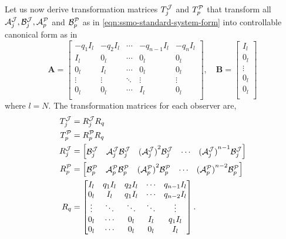 Let us now derive transformation matrices $T^{\mathcal{J}}_{j}$ and $T_p^{\mathcal{P}}$ that transform all $\mathcal{A}^{\mathcal{J}}_{j},\mathcal{B}^{\mathcal{J}}_{j},\mathcal{A}^{\mathcal{P}}_{p}$ and $\mathcal{B}^{\mathcal{P}}_{p}$ as in \eqref{eqn:ssmo-standard-system-form} into controllable canonical form as in \cite[Sec. 4.3.2]{Hespanha2018LinearTheory}
\begin{equation}\label{eqn:controllable-canonical-form}
    \mathbf{A} =
    \begin{bmatrix}
        -q_1I_l & -q_2I_l & \cdots & -q_{n-1}I_l & -q_nI_l \\
        I_l & 0_l & \cdots & 0_l & 0_l \\
        0_l & I_l & \cdots & 0_l & 0_l \\
        \vdots & \vdots & \ddots & \vdots & \vdots \\
        0_l & 0_l & \cdots & I_l & 0_l \\
    \end{bmatrix}, \quad
    \mathbf{B} = 
    \begin{bmatrix}
        I_l \\ 0_l \\ \vdots \\ 0_l \\ 0_l \\
    \end{bmatrix}
\end{equation}
where $l=N$. The transformation matrices for each observer are,
\begin{equation}\label{eqn:ssmo-transformation}
    \begin{split}
        T_{j}^{\mathcal{J}} &= R_j^{\mathcal{J}}R_q \\
        T_{p}^{\mathcal{P}} &= R_p^{\mathcal{P}}R_q \\
        R_j^{\mathcal{J}} &= 
        \begin{bmatrix}
            \mathcal{B}^{\mathcal{J}}_{j} & \mathcal{A}^{\mathcal{J}}_{j}\mathcal{B}^{\mathcal{J}}_{j} & {(\mathcal{A}^{\mathcal{J}}_{j})}^{2}\mathcal{B}^{\mathcal{J}}_{j} & \cdots & {(\mathcal{A}^{\mathcal{J}}_{j})}^{n-1}\mathcal{B}^{\mathcal{J}}_{j} \\
        \end{bmatrix} \\
        R_p^{\mathcal{P}} &= 
        \begin{bmatrix}
            \mathcal{B}^{\mathcal{P}}_{p} & \mathcal{A}^{\mathcal{P}}_{p}\mathcal{B}^{\mathcal{P}}_{p} & {(\mathcal{A}^{\mathcal{P}}_{p})}^{2}\mathcal{B}^{\mathcal{P}}_{p} & \cdots & {(\mathcal{A}^{\mathcal{P}}_{p})}^{n-2}\mathcal{B}^{\mathcal{P}}_{p} \\
        \end{bmatrix} \\
        R_q &=
        \begin{bmatrix}
            I_l & q_1I_l & q_2I_l & \cdots & q_{n-1}I_l \\
            0_l & I_l & q_1I_l & \cdots & q_{n-2}I_l \\
            \vdots & \ddots & \ddots & \ddots & \vdots \\
            0_l & \cdots & 0_l & I_l & q_1I_l \\
            0_l & \cdots & 0_l & 0_l & I_l \\
        \end{bmatrix}.
    \end{split}
\end{equation}
